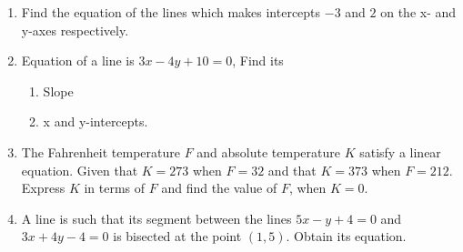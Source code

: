 \begin{enumerate}[label=\thesubsection.\arabic*, ref=\thesubsection.\theenumi]
\begin{enumerate}
\end{enumerate}
\item Find the equation of the lines which makes intercepts $-3$ and $2$ on the x- and y-axes respectively.
\item Equation of a line is $3x-4y+10=0$, Find its
\begin{enumerate}
\item  Slope
\item  x and y-intercepts.
\end{enumerate}
\item The Fahrenheit temperature $F$ and  absolute temperature $K$ satisfy a linear equation. Given that $K=273$ when $F=32$ and that $K=373$ when $F=212$. Express $K$ in terms of $F$ and find the value of $F$, when $K=0$.
\item A line is such that its segment between the lines $5x-y+4=0$ and $3x+4y-4=0$ is bisected at the point $(1,5)$. Obtain its equation.
\end{enumerate}
